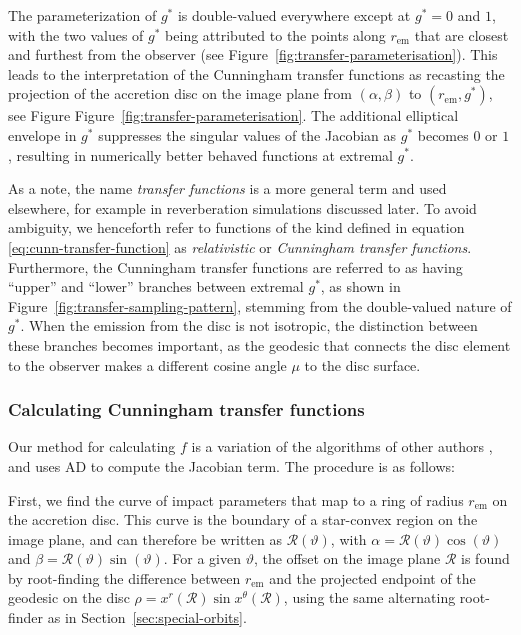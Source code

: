 \documentclass[fleqn,usenatbib]{mnras}
\newcommand{\rhoem}{r_\text{em}}
\begin{document}
The parameterization of $g^\ast$ is double-valued everywhere except at $g^\ast =
0$ and $1$, with the two values of $g^\ast$ being attributed to the points along
$\rhoem$ that are closest and furthest from the observer (see
Figure~\ref{fig:transfer-parameterisation}). This leads to the interpretation of the
Cunningham transfer functions as recasting the projection of the accretion disc
on the image plane from $(\alpha, \beta)$ to $(\rhoem, g^\ast)$, see Figure
Figure~\ref{fig:transfer-parameterisation}. The additional elliptical envelope in
$g^\ast$ suppresses the singular values of the Jacobian as $g^\ast$ becomes $0$
or $1$, resulting in numerically better behaved functions at extremal $g^\ast$.

As a note, the name \emph{transfer functions} is a more general term and used
elsewhere, for example in reverberation simulations discussed later. To avoid
ambiguity, we henceforth refer to functions of the kind defined in equation
\eqref{eq:cunn-transfer-function} as \emph{relativistic} or \emph{Cunningham
transfer functions}. Furthermore, the Cunningham transfer functions are referred
to as having ``upper'' and ``lower'' branches between extremal $g^\ast$, as
shown in Figure~\ref{fig:transfer-sampling-pattern}, stemming from the
double-valued nature of $g^\ast$. When the emission from the disc is not
isotropic, the distinction between these branches becomes important, as the
geodesic that connects the disc element to the observer makes a different cosine
angle $\mu$ to the disc surface.

\subsubsection{Calculating Cunningham transfer functions}

Our method for calculating $f$ is a variation of the algorithms of other authors
\citep{speith_photon_1995,bambi_testing_2017,abdikamalov_public_2019}, and uses
AD to compute the Jacobian term. The procedure is as follows:

First, we find the curve of impact parameters that map to a ring of radius
$\rhoem$ on the accretion disc. This curve is the boundary of a star-convex
region on the image plane, and can therefore be written as
$\mathcal{R}(\vartheta)$, with $\alpha = \mathcal{R}(\vartheta) \cos(\vartheta)$
and $\beta = \mathcal{R}(\vartheta) \sin(\vartheta)$. For a given $\vartheta$,
the offset on the image plane $\mathcal{R}$ is found by root-finding the
difference between $\rhoem$ and the projected endpoint of the geodesic on
the disc $\rho = x^r (\mathcal{R}) \sin x^\theta(\mathcal{R})$, using the same
alternating root-finder as in Section~\ref{sec:special-orbits}.
\end{document}
